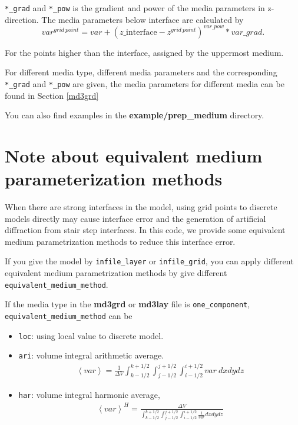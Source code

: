 \begin{itemize}
 \texttt{*\_grad} and \texttt{*\_pow} is the gradient and power of the media parameters in z-direction. The media parameters below interface are calculated by
 \begin{equation*}
        var^{grid~point} = var + (z\text{\_interface}-z^{grid~point})^{var\_pow} * var\_grad.
 \end{equation*}

\end{itemize}
For the points higher than the interface, assigned by the uppermost medium. 

For different media type, different media parameters and the corresponding \texttt{*\_grad} and \texttt{*\_pow} are given, the media parameters for different media can be found in Section \ref{md3grd}

You can also find examples in the \textbf{example/prep\_medium} directory.

\section{Note about equivalent medium parameterization methods} \label{equivalent_method} 
When there are strong interfaces in the model, using grid points to discrete models directly may cause interface error and the generation of artificial diffraction from stair step interfaces. In this code, we provide some equivalent medium parametrization methods to reduce this interface error.

If you give the model by \texttt{infile\_layer} or \texttt{infile\_grid}, you can apply different equivalent medium parametrization methods by give different \texttt{equivalent\_medium\_method}.

If the media type in the \textbf{md3grd} or \textbf{md3lay} file is \texttt{one\_component}, \texttt{equivalent\_medium\_method} can be
\begin{itemize}
 \item \texttt{loc}: using local value to discrete model. 
 \item \texttt{ari}: volume integral arithmetic average. 
  \begin{align}
    \left<var\right> = \frac{1}{\Delta V} \int_{k-1/2}^{k+1/2} \int_{j-1/2}^{j+1/2} \int_{i-1/2}^{i+1/2} var~dx dy dz 
  \end{align}
 \item \texttt{har}: volume integral harmonic average, 
  \begin{align}
    \left<var\right>^H = \frac{\Delta V}{\int_{k-1/2}^{k+1/2} \int_{j-1/2}^{j+1/2} \int_{i-1/2}^{i+1/2} \frac{1}{var} dx dy dz}
  \end{align}
\end{itemize}

